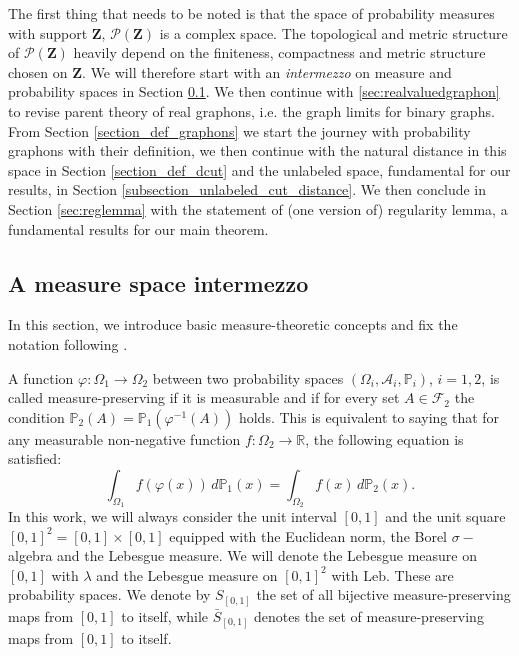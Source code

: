 \documentclass[12pt,twoside,a4paper]{article}
\def\P{\mathbb{P}}
\newcommand{\Space}{\mathbf{Z}}
\newcommand{\InvRelabel}{S_{[0,1]}}
\newcommand{\Relabel}{\bar{S}_{[0,1]}}
\renewcommand{\P}{\mathbb{P}}
\begin{document}
The first thing that needs to be noted is that the space of probability measures with support $\Space$, $\mathcal{P}(\Space)$ is a complex space. The topological and metric structure of $\mathcal{P}(\Space)$ heavily depend on the finiteness, compactness and metric structure chosen on $\Space$. We will therefore start with an \emph{intermezzo} on measure and probability spaces in Section \ref{sec:measurespaces}. We then continue with \ref{sec:realvaluedgraphon} to revise parent theory of real graphons, i.e. the graph limits for binary graphs. From Section \ref{section_def_graphons} we start the journey with probability graphons with their definition, we then continue with the natural distance in this space in Section \ref{section_def_dcut} and the unlabeled space, fundamental for our results, in Section \ref{subsection_unlabeled_cut_distance}.  We then conclude in Section \ref{sec:reglemma} with the statement of (one version of) regularity lemma, a fundamental results for our main theorem.



\subsection{A measure space intermezzo}\label{sec:measurespaces}
In this section, we introduce basic measure-theoretic concepts and fix the notation following \cite{abraham2023probabilitygraphons}. 

A function $\varphi : \Omega_1 \to \Omega_2$ between two probability spaces $(\Omega_i, \mathcal{A}_i, \P_i)$, $i = 1, 2$, is called measure-preserving if it is measurable and if for every set $A \in \mathcal{F}_2$ the condition $\P_2(A) = \P_1(\varphi^{-1}(A))$ holds. This is equivalent to saying that for any measurable non-negative function $f : \Omega_2 \to \mathbb{R}$, the following equation is satisfied:
\begin{equation}\label{eq:InvBijInt}
    \int_{\Omega_1} f(\varphi(x))\, d\P_1(x) = \int_{\Omega_2} f(x)\, d\P_2(x).
\end{equation}
In this work, we will always consider the unit interval $[0,1]$ and the unit square $[0,1]^2=[0,1]\times [0,1]$ equipped with the Euclidean norm, the Borel $\sigma-$algebra and the Lebesgue measure. We will denote the Lebesgue measure on $[0,1]$ with $\lambda$ and the Lebesgue measure on $[0,1]^2$ with $\text{Leb}.$ These are probability spaces.
We denote by $\InvRelabel$ the set of all bijective measure-preserving maps from $[0,1]$ to itself, while $\Relabel$ denotes the set of measure-preserving maps from $[0,1]$ to itself.
\medskip
\end{document}
